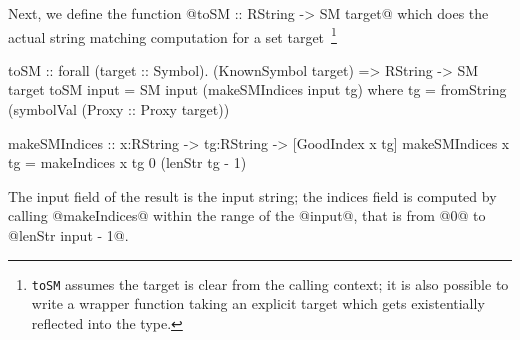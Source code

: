 Next, we define the function @toSM :: RString -> SM target@ which does
the actual string matching computation for a set
target~\footnote{\texttt{toSM} assumes the target is clear from the
  calling context; it is also possible to write a wrapper function
  taking an explicit target which gets existentially reflected into
  the type.}
%
%
\begin{code}
  toSM :: forall (target :: Symbol). (KnownSymbol target)
       => RString -> SM target
  toSM input = SM input (makeSMIndices input tg) where
    tg = fromString (symbolVal (Proxy :: Proxy target))

  makeSMIndices
    :: x:RString -> tg:RString -> [GoodIndex x tg]
  makeSMIndices x tg
    = makeIndices x tg 0 (lenStr tg - 1)
\end{code}
%
The input field of the result is the input string;
the indices field is computed by calling @makeIndices@
within the range of the @input@, that is from
@0@ to @lenStr input - 1@.
%


